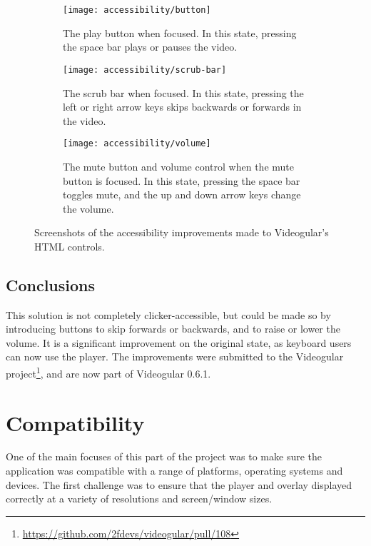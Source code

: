 \begin{figure}
	\begin{subfigure}[]{\textwidth}
		\texttt{[image: accessibility/button]}
		\caption{The play button when focused. In this state, pressing the space bar plays or pauses the video.}
		\label{Figure:Accessibility/Screenshots/Button}
	\end{subfigure}
	\begin{subfigure}[]{\textwidth}
		\texttt{[image: accessibility/scrub-bar]}
		\caption{The scrub bar when focused. In this state, pressing the left or right arrow keys skips backwards or forwards in the video.}
		\label{Figure:Accessibility/Screenshots/ScrubBar}
	\end{subfigure}
	\begin{subfigure}[]{\textwidth}
		\texttt{[image: accessibility/volume]}
		\caption{The mute button and volume control when the mute button is focused. In this state, pressing the space bar toggles mute, and the up and down arrow keys change the volume.}
		\label{Figure:Accessibility/Screenshots/Volume}
	\end{subfigure}
	\caption{Screenshots of the accessibility improvements made to Videogular's HTML controls.}
	\label{Figure:Accessibility/Screenshots}
\end{figure}

\subsection{Conclusions} 
This solution is not completely clicker-accessible, but could be made so by introducing buttons to skip forwards or backwards, and to raise or lower the volume. It is a significant improvement on the original state, as keyboard users can now use the player. The improvements were submitted to the \gls{Videogular} project\footnote{\url{https://github.com/2fdevs/videogular/pull/108}}, and are now part of \gls{Videogular} 0.6.1.


\section{Compatibility} 
\label{Section:Compatibility}

One of the main focuses of this part of the project was to make sure the application was compatible with a range of platforms, operating systems and devices. The first challenge was to ensure that the player and overlay displayed correctly at a variety of resolutions and screen/window sizes. 

